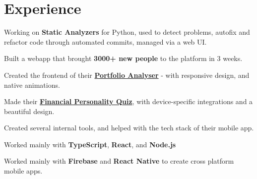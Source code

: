 \documentclass[]{resume}
\begin{document}
\begin{minipage}[t]{0.35\textwidth}
%
%

\end{minipage} 
\hfill
\begin{minipage}[t]{0.62\textwidth} 


\section{Experience}
\vspace{\topsep} %
\begin{tightemize}
\item Working on \textbf{Static Analyzers} for Python, used to detect problems, autofix and refactor code through automated commits, managed via a web UI.
\end{tightemize}
\sectionsep

\begin{tightemize}
\item Built a webapp that brought \textbf{3000+ new people} to the platform in 3 weeks.
\item Created the frontend of their  \href{https://jupiter.money/portfolio-analyser}{\textbf{Portfolio Analyser}} - with responsive design, and native animations.
\item Made their \href{https://jupiter.money/quiz}{\textbf{Financial Personality Quiz}}, with device-specific integrations and a beautiful design.
\item Created several internal tools, and helped with the tech stack of their mobile app.
\item Worked mainly with \textbf{TypeScript}, \textbf{React}, and \textbf{Node.js}
\end{tightemize}
\sectionsep

\begin{tightemize}
\item Worked mainly with \textbf{Firebase} and \textbf{React Native} to create cross platform mobile apps.
\end{tightemize}
\sectionsep



\end{minipage}
\end{document}
